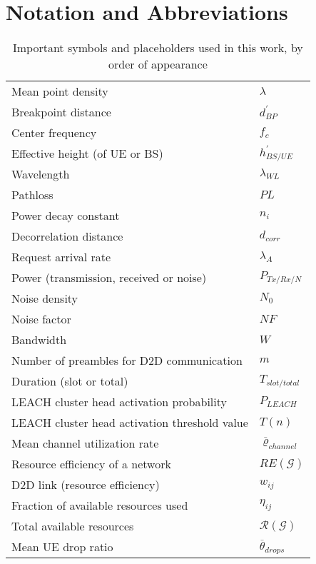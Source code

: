 \chapter{Notation and Abbreviations}
\begin{table}[h]
\begin{tabular}{ll}
Mean point density & $\lambda$\\
Breakpoint distance & $d^\prime_{BP}$\\
Center frequency & $f_c$\\
Effective height (of UE or BS) & $h^\prime_{BS/UE}$\\
Wavelength & $\lambda_{WL}$\\
Pathloss & $PL$\\
Power decay constant & $n_i$\\
Decorrelation distance & $d_{corr}$\\
Request arrival rate & $\lambda_A$\\
Power (transmission, received or noise) & $P_{Tx/Rx/N}$\\
Noise density & $N_0$\\
Noise factor & $NF$ \\
Bandwidth & $W$ \\
Number of preambles for D2D communication & $m$\\
Duration (slot or total) & $T_{slot/total}$\\
LEACH cluster head activation probability & $P_{LEACH}$\\
LEACH cluster head activation threshold value & $T(n)$\\
Mean channel utilization rate & $\overline{\varrho}_{channel}$\\
Resource efficiency of a network & $RE\mathcal{(G)}$\\
D2D link (resource efficiency) &$w_{ij}$\\
Fraction of available resources used & $\eta_{ij}$\\
Total available resources & $\mathcal{R(G)}$\\
Mean UE drop ratio & $\overline{\theta}_{drops}$\\
\end{tabular}
\caption{Important symbols and placeholders used in this work, by order of appearance}
\end{table}

